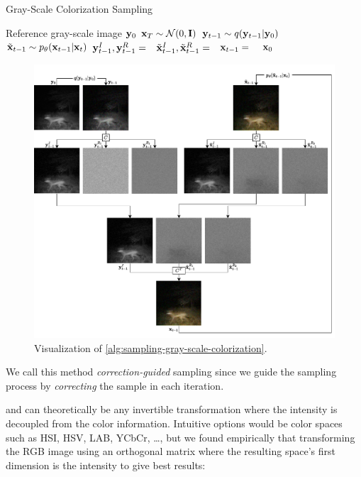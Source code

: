 \begin{algorithm}[htp!]
   \caption{Gray-Scale Colorization Sampling}
   \label{alg:sampling-gray-scale-colorization}
   \begin{algorithmic}
      \Require Reference gray-scale image $\mathbf{y}_0$
      \State $\mathbf{x}_T \sim \mathcal{N}(0, \mathbf{I})$
      \State $\mathbf{y}_{t-1} \sim q(\mathbf{y}_{t-1}| \mathbf{y}_0)$
      \State $\tilde{\mathbf{x}}_{t-1} \sim p_\theta(\mathbf{x}_{t-1}|\mathbf{x}_t)$
      \State $\mathbf{y}_{t-1}^I, \mathbf{y}_{t-1}^R = $\ 
      \State $\tilde{\mathbf{x}}_{t-1}^I, \tilde{\mathbf{x}}_{t-1}^R=$\ 
      \State $\mathbf{x}_{t-1}=$ \ 
      \EndFor
      \Return $\mathbf{x}_0$
   \end{algorithmic}
\end{algorithm}

\begin{figure}
   \includegraphics[width=\textwidth]{gfx/Gray-Scale-Colorization-Sampling.pdf}
   \caption{Visualization of \autoref{alg:sampling-gray-scale-colorization}.}
   \label{fig:sampling-gray-scale-colorization}
\end{figure}

We call this method \textit{correction-guided} sampling since we guide the sampling process by \textit{correcting} the sample in each iteration.

 and  can theoretically be any invertible transformation where the intensity is decoupled from the color information.
Intuitive options would be color spaces such as HSI, HSV, LAB, YCbCr, \dots,
but we found empirically that transforming the RGB image using an orthogonal matrix where the resulting space's first dimension is the intensity to give best results:

